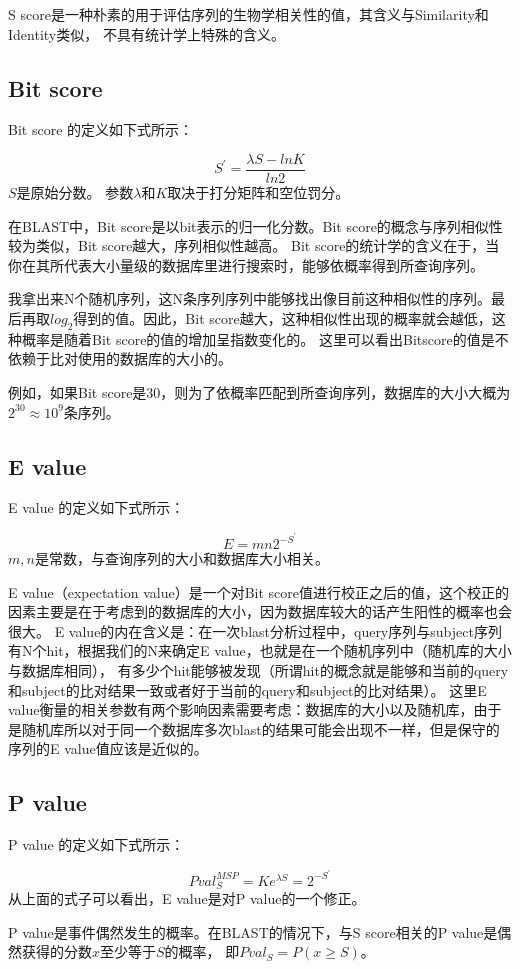 \documentclass[cn,black,12pt,normal]{elegantnote}
\begin{document}
S score是一种朴素的用于评估序列的生物学相关性的值，其含义与Similarity和Identity类似，
不具有统计学上特殊的含义。

\subsection{Bit score}
Bit score 的定义如下式所示：

\begin{equation}
S^\prime =\frac{\lambda S-ln K}{ln2} 
\end{equation}
$S$是原始分数。 参数$\lambda$和$K$取决于打分矩阵和空位罚分。

在BLAST中，Bit score是以bit表示的归一化分数。Bit score的概念与序列相似性较为类似，Bit score越大，序列相似性越高。
Bit score的统计学的含义在于，当你在其所代表大小量级的数据库里进行搜索时，能够依概率得到所查询序列。

我拿出来N个随机序列，这N条序列序列中能够找出像目前这种相似性的序列。最后再取$log_2$得到的值。因此，Bit score越大，这种相似性出现的概率就会越低，这种概率是随着Bit score的值的增加呈指数变化的。
这里可以看出Bitscore的值是不依赖于比对使用的数据库的大小的。

例如，如果Bit score是30，则为了依概率匹配到所查询序列，数据库的大小大概为$2^{30}\approx10^{9}$条序列。


\subsection{E value}
E value 的定义如下式所示：

\begin{equation}
E=mn2^{-S^\prime }
\end{equation}
$m,n$是常数，与查询序列的大小和数据库大小相关。


E value（expectation value）是一个对Bit score值进行校正之后的值，这个校正的因素主要是在于考虑到的数据库的大小，因为数据库较大的话产生阳性的概率也会很大。
E value的内在含义是：在一次blast分析过程中，query序列与subject序列有N个hit，根据我们的N来确定E value，也就是在一个随机序列中（随机库的大小与数据库相同），
有多少个hit能够被发现（所谓hit的概念就是能够和当前的query和subject的比对结果一致或者好于当前的query和subject的比对结果）。
这里E value衡量的相关参数有两个影响因素需要考虑：数据库的大小以及随机库，由于是随机库所以对于同一个数据库多次blast的结果可能会出现不一样，但是保守的序列的E value值应该是近似的。

\subsection{P value}
P value 的定义如下式所示：

\begin{equation}
Pval_S^{MSP}=Ke^{\lambda S}=2^{-S^\prime}
\end{equation}
从上面的式子可以看出，E value是对P value的一个修正。

P value是事件偶然发生的概率。在BLAST的情况下，与S score相关的P value是偶然获得的分数$x$至少等于$S$的概率，
即$Pval_S=P(x\geq S)$。


{}
\end{document}

